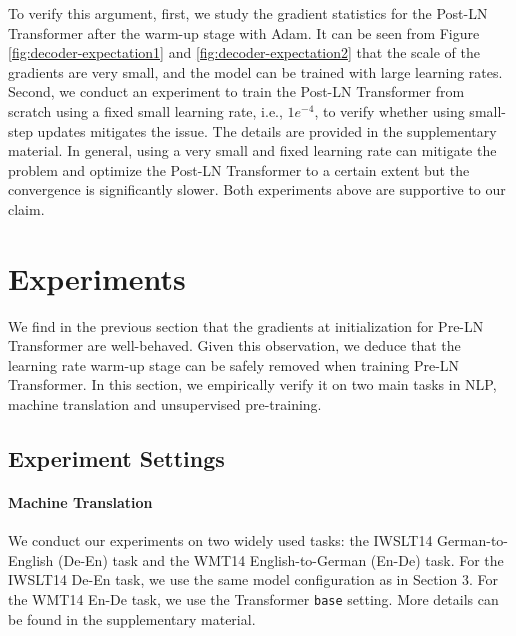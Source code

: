 \documentclass{article}
\begin{document}
To verify this argument, first, we study the gradient statistics for the Post-LN Transformer after the warm-up stage with Adam. It can be seen from Figure \ref{fig:decoder-expectation1} and \ref{fig:decoder-expectation2} that the scale of the gradients are very small, and the model can be trained with large learning rates. Second, we conduct an experiment to train the Post-LN Transformer from scratch using a fixed small learning rate, i.e., $1e^{-4}$,  to verify whether using small-step updates mitigates the issue. The details are provided in the supplementary material. In general, using a very small and fixed learning rate can mitigate the problem and optimize the Post-LN Transformer to a certain extent but the convergence is significantly slower. Both experiments above are supportive to our claim.

\section{Experiments}
We find in the previous section that the gradients at initialization for Pre-LN Transformer are well-behaved. Given this observation, we deduce that the learning rate warm-up stage can be safely removed when training Pre-LN Transformer. In this section, we empirically verify it on two main tasks in NLP, machine translation and unsupervised pre-training.

\subsection{Experiment Settings}
\paragraph{Machine Translation}
We conduct our experiments on two widely used tasks: the IWSLT14 German-to-English (De-En) task and the WMT14 English-to-German (En-De) task. 
For the IWSLT14 De-En task, we use the same model configuration as in Section 3. For the WMT14 En-De task, we use the Transformer \texttt{base} setting. More details can be found in the supplementary material.  
\end{document}
